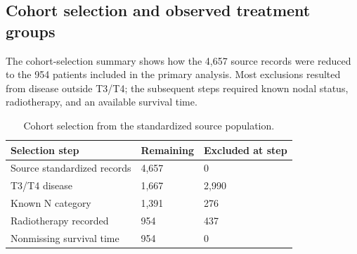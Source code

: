 \documentclass[9pt,twocolumn]{extarticle}
\begin{document}
\subsection{Cohort selection and observed treatment groups}
The cohort-selection summary shows how the 4,657 source records were reduced to the 954 patients included in the primary analysis. Most exclusions resulted from disease outside T3/T4; the subsequent steps required known nodal status, radiotherapy, and an available survival time.\par
\begin{table}[t]
\centering
\caption{Cohort selection from the standardized source population.}
\small
\begin{tabularx}{\columnwidth}{@{}XXX@{}}
\toprule
\textbf{Selection step} & \textbf{Remaining} & \textbf{Excluded at step} \\
\midrule
Source standardized records & 4,657 & 0 \\
T3/T4 disease & 1,667 & 2,990 \\
Known N category & 1,391 & 276 \\
Radiotherapy recorded & 954 & 437 \\
Nonmissing survival time & 954 & 0 \\
\bottomrule
\end{tabularx}
\end{table}
\end{document}
